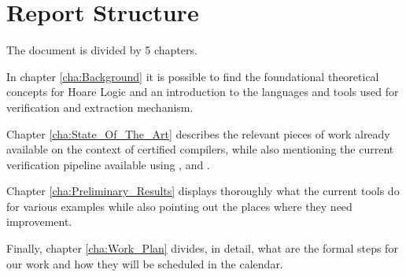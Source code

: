 \section{Report Structure}
\label{sec:Report_Structure}

The document is divided by 5 chapters. 

In chapter \ref{cha:Background} it is possible to find the foundational theoretical concepts for Hoare Logic and an introduction to 
the languages and tools used for verification and extraction mechanism.

Chapter \ref{cha:State_Of_The_Art} describes the relevant pieces of work already available on the context of certified compilers, 
while also mentioning the current verification pipeline available using \cameleer, \whythree and \cml. 

Chapter \ref{cha:Preliminary_Results} displays thoroughly what the current tools do for various examples while also pointing out the 
places where they need improvement. 

Finally, chapter \ref{cha:Work_Plan} divides, in detail, what are the formal steps for our work and how they will be scheduled in 
the calendar.